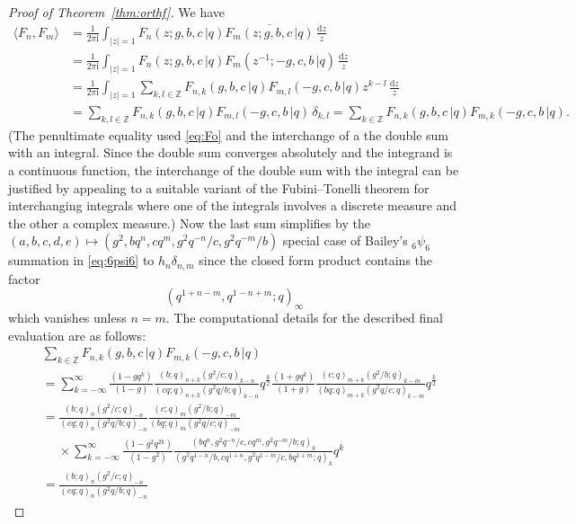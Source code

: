 \documentclass[reqno,12pt]{amsart}
\theoremstyle{remark}
\numberwithin{equation}{section}
\newcommand{\Z}{\mathbb Z}
\begin{document}
\begin{proof}[Proof of Theorem~\ref{thm:orthf}]
We have
\begin{align*}
  \langle F_n,F_m\rangle
  &=\frac 1{2\pi\mathrm i}\int_{|z|=1}F_n(z;g,b,c\,|q)
     \overline{F_m(z;g,b,c\,|q)}\,
\frac{{\mathrm d}z}z\\
  &=\frac 1{2\pi\mathrm i}\int_{|z|=1}F_n(z;g,b,c\,|q)
    F_m(z^{-1};-g,c,b\,|q)\,
\frac{{\mathrm d}z}z\\
&=\frac 1{2\pi\mathrm i}\int_{|z|=1}
\sum_{k,l\in\Z}F_{n,k}(g,b,c\,|q)F_{m,l}(-g,c,b\,|q)z^{k-l}\,
\frac{{\mathrm d}z}z
\\&
=\sum_{k,l\in\Z}F_{n,k}(g,b,c\,|q)F_{m,l}(-g,c,b\,|q)\,\delta_{k,l}
=\sum_{k\in\Z}F_{n,k}(g,b,c\,|q)F_{m,k}(-g,c,b\,|q).
\end{align*}
(The penultimate equality used \eqref{eq:Fo} and the interchange
of a the double sum with an integral.
Since the double sum converges absolutely and the integrand is
a continuous function, the interchange of the double sum with the
integral can be justified by appealing to a suitable variant of the
Fubini--Tonelli theorem for interchanging integrals
where one of the integrals involves a discrete measure
and the other a complex measure.)
Now the last sum simplifies
by the $(a,b,c,d,e)\mapsto(g^2,bq^n,cq^m,g^2q^{-n}/c,g^2q^{-m}/b)$
special case of Bailey's ${}_6\psi_6$ summation in \eqref{eq:6psi6}
to $h_n\delta_{n,m}$ since the closed form product contains the factor
\begin{equation*}
(q^{1+n-m},q^{1-n+m};q)_\infty
\end{equation*}
which vanishes unless $n=m$. The computational details for the described
final evaluation are as follows:
\begin{align*}
&\sum_{k\in\Z}F_{n,k}(g,b,c\,|q)F_{m,k}(-g,c,b\,|q)\\
  &=\sum _{k=-\infty}^{\infty}\frac{(1-gq^k)}{(1-g)}
    \frac{(b;q)_{n+k}(g^2/c;q)_{k-n}}{(cq;q)_{n+k}(g^2q/b;q)_{k-n}}q^{\frac k2}
    \frac{(1+gq^k)}{(1+g)}
    \frac{(c;q)_{m+k}(g^2/b;q)_{k-m}}
    {(bq;q)_{m+k}(g^2q/c;q)_{k-m}}q^{\frac k2}\\
  &= \frac{(b;q)_{n}(g^2/c;q)_{-n}}{(cq;q)_{n}(g^2q/b;q)_{-n}}
    \frac{(c;q)_{m}(g^2/b;q)_{-m}}{(bq;q)_{m}(g^2q/c;q)_{-m}}\\
  &\quad\;\times\sum _{k=-\infty}^{\infty}\frac{(1-g^2q^{2k})}{(1-g^2)}
    \frac{(bq^n,g^2q^{-n}/c,cq^m,g^2q^{-m}/b;q)_k}
    {(g^2q^{1-n}/b,cq^{1+n},g^2q^{1-m}/c,bq^{1+m};q)_k}q^k\\
  &= \frac{(b;q)_{n}(g^2/c;q)_{-n}}{(cq;q)_{n}(g^2q/b;q)_{-n}}

\end{align*}
\end{proof}
\end{document}
